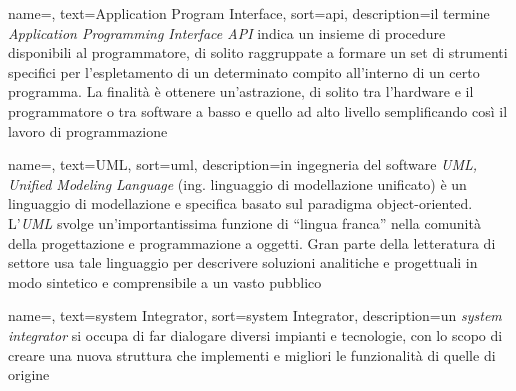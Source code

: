 
\renewcommand{\acronymname}{Acronimi e abbreviazioni}





{
    name=,
    text=Application Program Interface,
    sort=api,
    description={il termine \emph{Application Programming Interface API} indica un insieme di procedure disponibili al programmatore, di solito raggruppate a formare un set di strumenti specifici per l'espletamento di un determinato compito all'interno di un certo programma. La finalità è ottenere un'astrazione, di solito tra l'hardware e il programmatore o tra software a basso e quello ad alto livello semplificando così il lavoro di programmazione}
}

{
    name=,
    text=UML,
    sort=uml,
    description={in ingegneria del software \emph{UML, Unified Modeling Language} (ing. linguaggio di modellazione unificato) è un linguaggio di modellazione e specifica basato sul paradigma object-oriented. L'\emph{UML} svolge un'importantissima funzione di ``lingua franca'' nella comunità della progettazione e programmazione a oggetti. Gran parte della letteratura di settore usa tale linguaggio per descrivere soluzioni analitiche e progettuali in modo sintetico e comprensibile a un vasto pubblico}
}

{
    name=,
    text=system Integrator,
    sort=system Integrator,
    description={un \emph{system integrator} si occupa di far dialogare diversi impianti e tecnologie, con lo scopo di creare una nuova struttura che implementi e migliori le funzionalità di quelle di origine}
}


